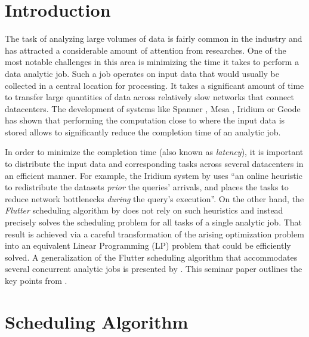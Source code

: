 
\theoremstyle{definition}
\newtheorem{definition}{Definition}[section]

\theoremstyle{definition}
\newtheorem{optimization}{Optimization Problem}

\section{Introduction}

The task of analyzing large volumes of data is fairly common in the industry and has attracted a considerable amount of attention from researches. One of the most notable challenges in this area is minimizing the time it takes to perform a data analytic job. Such a job operates on input data that would usually be collected in a central location for processing. It takes a significant amount of time to transfer large quantities of data across relatively slow networks that connect datacenters. The development of systems like Spanner \cite{Corbett2012}, Mesa \cite{Gupta2014}, Iridium \cite{Pu2015} or Geode \cite{Vulimiri2015} has shown that performing the computation close to where the input data is stored allows to significantly reduce the completion time of an analytic job.

In order to minimize the completion time (also known as \emph{latency}), it is important to distribute the input data and corresponding tasks across several datacenters in an efficient manner. For example, the Iridium system by \citet{Pu2015} uses ``an online heuristic to redistribute the datasets \emph{prior} the queries' arrivals, and places the tasks to reduce network bottlenecks \emph{during} the query's execution''. On the other hand, the \emph{Flutter} scheduling algorithm by \citet{Hu2016} does not rely on such heuristics and instead precisely solves the scheduling problem for all tasks of a single analytic job. That result is achieved via a careful transformation of the arising optimization problem into an equivalent Linear Programming (LP) problem that could be efficiently solved. A generalization of the Flutter scheduling algorithm that accommodates several concurrent analytic jobs is presented by \citet{Chen2017}. This seminar paper outlines the key points from \cite{Chen2017}.

\section{Scheduling Algorithm}

